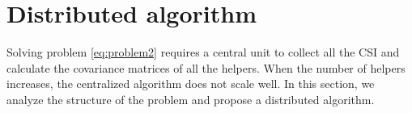 \documentclass[journal]{IEEEtran}
\begin{document}
%


\section{Distributed algorithm} \label{sec:distributed algorithm}
Solving problem \eqref{eq:problem2} requires a central unit to collect all the CSI and calculate the covariance matrices of all the helpers. When the number of helpers increases, the centralized algorithm does not scale well. 
In this section, we analyze the structure of the problem and propose a distributed algorithm. 
\end{document}
